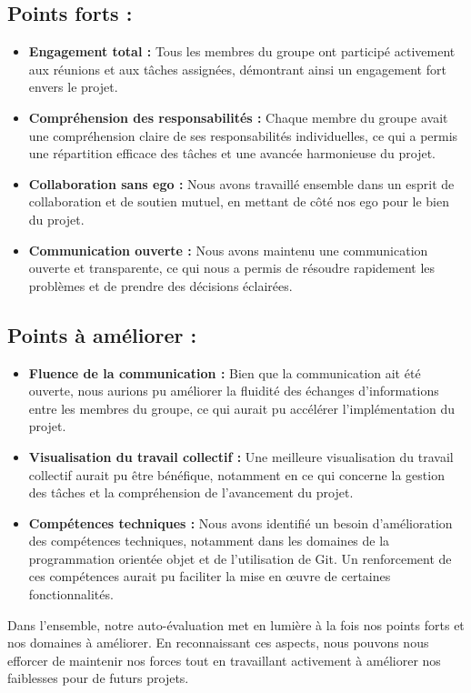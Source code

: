 \documentclass{article}
\begin{document}
\subsection{Points forts :}
\begin{itemize}
\item \textbf{Engagement total :} Tous les membres du groupe ont participé activement aux réunions et aux tâches assignées, démontrant ainsi un engagement fort envers le projet.
\item \textbf{Compréhension des responsabilités :} Chaque membre du groupe avait une compréhension claire de ses responsabilités individuelles, ce qui a permis une répartition efficace des tâches et une avancée harmonieuse du projet.
\item \textbf{Collaboration sans ego :} Nous avons travaillé ensemble dans un esprit de collaboration et de soutien mutuel, en mettant de côté nos ego pour le bien du projet.
\item \textbf{Communication ouverte :} Nous avons maintenu une communication ouverte et transparente, ce qui nous a permis de résoudre rapidement les problèmes et de prendre des décisions éclairées.
\end{itemize}

\subsection{Points à améliorer :}
\begin{itemize}
\item \textbf{Fluence de la communication :} Bien que la communication ait été ouverte, nous aurions pu améliorer la fluidité des échanges d'informations entre les membres du groupe, ce qui aurait pu accélérer l'implémentation du projet.
\item \textbf{Visualisation du travail collectif :} Une meilleure visualisation du travail collectif aurait pu être bénéfique, notamment en ce qui concerne la gestion des tâches et la compréhension de l'avancement du projet.
\item \textbf{Compétences techniques :} Nous avons identifié un besoin d'amélioration des compétences techniques, notamment dans les domaines de la programmation orientée objet et de l'utilisation de Git. Un renforcement de ces compétences aurait pu faciliter la mise en œuvre de certaines fonctionnalités.
\end{itemize}

Dans l'ensemble, notre auto-évaluation met en lumière à la fois nos points forts et nos domaines à améliorer. En reconnaissant ces aspects, nous pouvons nous efforcer de maintenir nos forces tout en travaillant activement à améliorer nos faiblesses pour de futurs projets.
\end{document}
